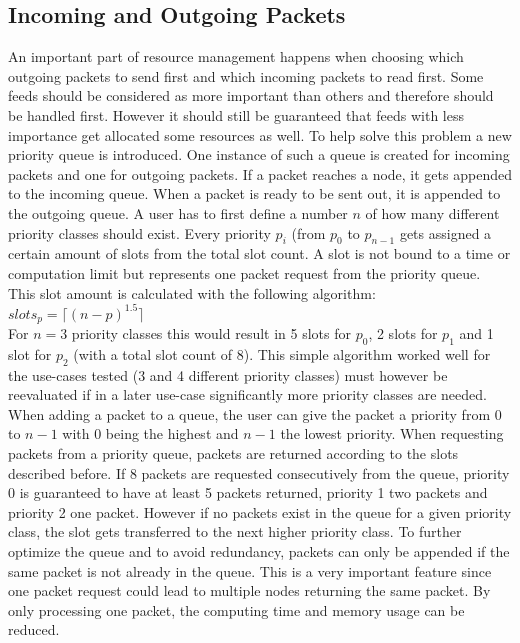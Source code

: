 \subsection{Incoming and Outgoing Packets}
\label{sec:io}
An important part of resource management happens when choosing which outgoing packets to send first and which incoming packets to read first. Some feeds should be considered as more important than others and therefore should be handled first. However it should still be guaranteed that feeds with less importance get allocated some resources as well. To help solve this problem a new priority queue is introduced. One instance of such a queue is created for incoming packets and one for outgoing packets. If a packet reaches a node, it gets appended to the incoming queue. When a packet is ready to be sent out, it is appended to the outgoing queue. A user has to first define a number $n$ of how many different priority classes should exist. Every priority $p_i$ (from $p_0$ to $p_{n - 1}$ gets assigned a certain amount of slots from the total slot count. A slot is not bound to a time or computation limit but represents one packet request from the priority queue. This slot amount is calculated with the following algorithm: \\ 
$slots_p = \lceil (n - p)^{1.5} \rceil$ \\
For $n = 3$ priority classes this would result in 5 slots for $p_0$, 2 slots for $p_1$ and 1 slot for $p_2$ (with a total slot count of 8). This simple algorithm worked well for the use-cases tested (3 and 4 different priority classes) must however be reevaluated if in a later use-case significantly more priority classes are needed. \\
When adding a packet to a queue, the user can give the packet a priority from 0 to $n - 1$ with 0 being the highest and $n-1$ the lowest priority. When requesting packets from a priority queue, packets are returned according to the slots described before. If 8 packets are requested consecutively from the queue, priority 0 is guaranteed to have at least 5 packets returned, priority 1 two packets and priority 2 one packet. However if no packets exist in the queue for a given priority class, the slot gets transferred to the next higher priority class. To further optimize the queue and to avoid redundancy, packets can only be appended if the same packet is not already in the queue. This is a very important feature since one packet request could lead to multiple nodes returning the same packet. By only processing one packet, the computing time and memory usage can be reduced.

